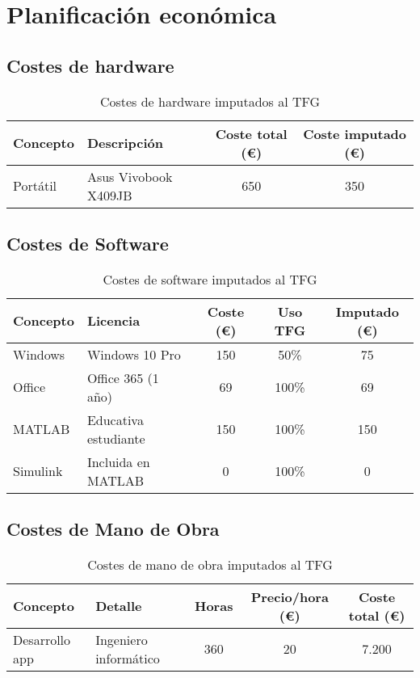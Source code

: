\section{Planificación económica}

\subsection{Costes de hardware}

\begin{table}[H]

\centering
\small
\begin{tabular}{|l|l|c|c|}
\hline
\textbf{Concepto} & \textbf{Descripción} & \textbf{Coste total (€)} & \textbf{Coste imputado (€)} \\
\hline
Portátil & Asus Vivobook X409JB & 650 & 350 \\
\hline
\end{tabular}
\caption{Costes de hardware imputados al TFG}
\end{table}

\subsection{Costes de Software}

\begin{table}[H]
\centering
\small
\begin{tabular}{|l|l|c|c|c|}
\hline
\textbf{Concepto} & \textbf{Licencia} & \textbf{Coste (€)} & \textbf{Uso TFG} & \textbf{Imputado (€)} \\
\hline
Windows & Windows 10 Pro & 150 & 50\% & 75 \\
Office & Office 365 (1 año) & 69 & 100\% & 69 \\
MATLAB & Educativa estudiante & 150 & 100\% & 150 \\
Simulink & Incluida en MATLAB & 0 & 100\% & 0 \\
\hline
\end{tabular}
\caption{Costes de software imputados al TFG}
\end{table}

\subsection{Costes de Mano de Obra}

\begin{table}[H]
\centering
\begin{tabular}{|l|p{5cm}|c|c|c|}
\hline
\textbf{Concepto} & \textbf{Detalle} & \textbf{Horas} & \textbf{Precio/hora (€)} & \textbf{Coste total (€)} \\
\hline
Desarrollo app & Ingeniero informático & 360 & 20 & 7.200 \\
\hline
\end{tabular}
\caption{Costes de mano de obra imputados al TFG}
\end{table}

